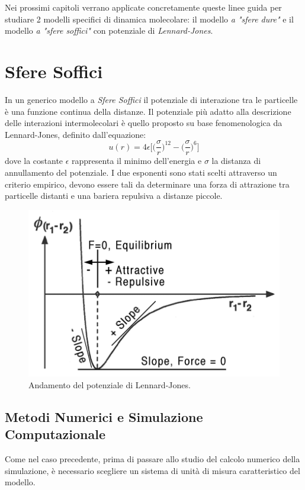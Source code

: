 \documentclass[11pt]{article}
\theoremstyle{plain}
\theoremstyle{remark}
\begin{document}
Nei prossimi capitoli verrano applicate concretamente queste linee guida per studiare 2 modelli specifici di dinamica molecolare: il modello \emph{a "sfere dure"} e il modello \emph{a "sfere soffici"} con potenziale di \emph{ Lennard-Jones}.

\newpage
\section{Sfere Soffici}\label{Soffici}
In un generico modello a \emph{Sfere Soffici} il potenziale di interazione tra le particelle è una funzione continua della distanze.
\newline
Il potenziale più adatto alla descrizione delle interazioni intermolecolari è quello proposto su base fenomenologica da Lennard-Jones, definito dall'equazione:
\begin{equation}
u(r) = 4\epsilon \biggr[\big(\frac{\sigma}{r} \big)^{12} - \big(\frac{\sigma}{r} \big)^6 \biggr]
\end{equation}
dove la costante $\epsilon$ rappresenta il minimo dell'energia e $\sigma$ la distanza di annullamento del potenziale.
I due esponenti sono stati scelti attraverso un criterio empirico, devono essere tali da determinare una forza di attrazione tra particelle distanti e una bariera repulsiva a distanze piccole.
	\begin{figure}
		\centering
		\includegraphics[scale=0.5]{Immagini/LJ}
		\caption[Potenziale di L.-J.]{Andamento del potenziale di Lennard-Jones.}\label{fig: LJunCut}
	\end{figure}




\clearpage
\subsection{Metodi Numerici e Simulazione Computazionale}
Come nel caso precedente, prima di passare allo studio del calcolo numerico della simulazione, è necessario scegliere un sistema di unità di misura caratteristico del modello.
\end{document}
